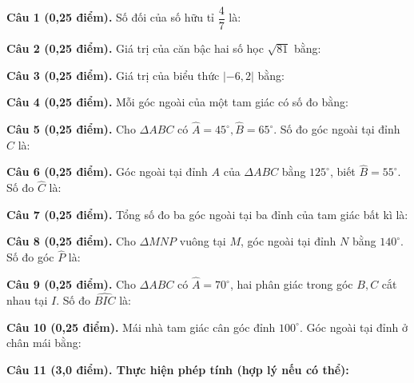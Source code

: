 \documentclass[12pt,a4paper]{article}
\begin{document}
\vspace{1.5mm}
\noindent\textbf{Câu 1 (0,25 điểm).} Số đối của số hữu tỉ $\dfrac{4}{7}$ là: \par\vspace{2.7mm}
\noindent\textbf{Câu 2 (0,25 điểm).} Giá trị của căn bậc hai số học $\sqrt{81}$ bằng: \par\vspace{2.7mm}
\noindent\textbf{Câu 3 (0,25 điểm).} Giá trị của biểu thức $|-6{,}2|$ bằng: \par\vspace{2.7mm}
\noindent\textbf{Câu 4 (0,25 điểm).} Mỗi góc ngoài của một tam giác có số đo bằng: \par\vspace{2.7mm}
\noindent\textbf{Câu 5 (0,25 điểm).} Cho $\Delta ABC$ có $\widehat{A} = 45^\circ, \widehat{B} = 65^\circ$. Số đo góc ngoài tại đỉnh $C$ là: \par\vspace{2.7mm}
\noindent\textbf{Câu 6 (0,25 điểm).} Góc ngoài tại đỉnh $A$ của $\Delta ABC$ bằng $125^\circ$, biết $\widehat{B} = 55^\circ$. Số đo $\widehat{C}$ là: \par\vspace{2.7mm}
\noindent\textbf{Câu 7 (0,25 điểm).} Tổng số đo ba góc ngoài tại ba đỉnh của tam giác bất kì là: \par\vspace{2.7mm}
\noindent\textbf{Câu 8 (0,25 điểm).} Cho $\Delta MNP$ vuông tại $M$, góc ngoài tại đỉnh $N$ bằng $140^\circ$. Số đo góc $\widehat{P}$ là: \par\vspace{2.7mm}
\noindent\textbf{Câu 9 (0,25 điểm).} Cho $\Delta ABC$ có $\widehat{A} = 70^\circ$, hai phân giác trong góc $B, C$ cắt nhau tại $I$. Số đo $\widehat{BIC}$ là: \par\vspace{2.7mm}
\noindent\textbf{Câu 10 (0,25 điểm).} Mái nhà tam giác cân góc đỉnh $100^\circ$. Góc ngoài tại đỉnh ở chân mái bằng: \par\vspace{2.7mm}
\vspace{0.2mm}
\noindent\textbf{Câu 11 (3,0 điểm). Thực hiện phép tính (hợp lý nếu có thể):}
\vspace{0.8mm}
\end{document}
